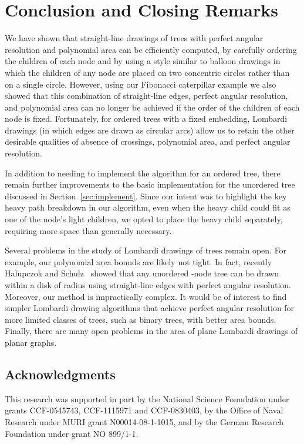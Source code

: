 \documentclass[11pt]{article}
\begin{document}
\section{Conclusion and Closing Remarks}
\label{sec:conclusion}
We have shown that straight-line drawings of trees 
with perfect angular resolution and polynomial area can be efficiently computed, by carefully
ordering the children of each node and by using a style similar to
balloon drawings in which the children of any node are placed on two
concentric circles rather than on a single circle. However, using our
Fibonacci caterpillar example we also showed that this combination of
straight-line edges, perfect angular resolution, and polynomial area can
no longer be achieved if the order of the children of each node is fixed. Fortunately, for ordered trees with a fixed embedding, Lombardi drawings (in which edges are drawn as circular arcs) allow us to retain the other desirable qualities of absence of crossings, polynomial area, and perfect angular
resolution. 


In addition to needing to implement the algorithm for an
ordered tree,
there remain further improvements to the basic implementation 
for the unordered tree discussed in Section~\ref{sec:implement}.
Since our intent was to highlight the key heavy path breakdown in our algorithm,
even when the heavy child could fit as one of the node's light children,
we opted to place the heavy child separately, requiring more
space than generally necessary.

Several problems in the study of Lombardi drawings of trees remain open.
For example, our polynomial area bounds are likely not tight. In fact, recently Halupczok and Schulz~\cite{hs-pbwpaoa-11} showed that any unordered -node tree can be drawn within a disk of radius  using straight-line edges with perfect angular resolution. 
Moreover, our method
is impractically complex. It would be of interest to find simpler
Lombardi drawing algorithms that achieve perfect angular resolution
for more limited classes of trees, such as binary trees, with better area bounds.
Finally, there are many open problems in the area of plane Lombardi drawings of planar graphs.

\subsection*{Acknowledgments}

This research was supported in part by the National Science
Foundation under grants CCF-0545743, CCF-1115971 and CCF-0830403,
by the
Office of Naval Research under MURI grant N00014-08-1-1015, and by the
German Research Foundation under grant NO 899/1-1.

{\small
\raggedright
\setlength{\itemsep}{0pt} 


}
\end{document}

